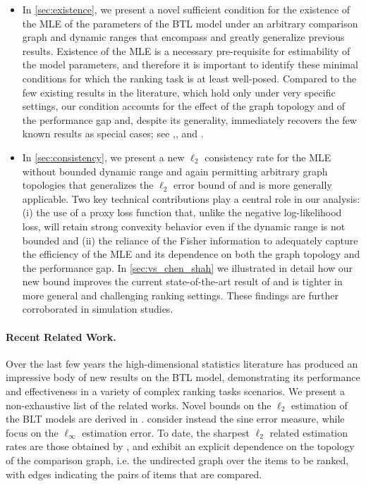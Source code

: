 \begin{itemize}
    \item In \ref{sec:existence}, we present a novel sufficient condition for the existence of the MLE of the parameters of the BTL model under an arbitrary comparison graph and dynamic ranges that encompass and greatly generalize previous results. Existence of the MLE is a necessary pre-requisite for estimability of the model parameters, and therefore it is important to identify these minimal conditions for which the ranking task is at least well-posed. Compared to the few existing results in the literature, which hold only under very specific settings, our condition accounts for the effect of the graph topology and of the performance gap and, despite its generality, immediately recovers the few known results   as special cases; see \citet{simons1999asymptotics},\citet{yan2012sparse}, and \citet{han2020asymptotic}. 

    \item In \ref{sec:consistency}, we present a new $\ell_2$ consistency rate for the MLE without bounded dynamic range and again permitting arbitrary graph topologies that generalizes the $\ell_2$ error bound of \cite{shah2016estimation} and is more generally applicable. Two key technical contributions play a central role in our analysis:  (i) the use of a proxy loss function  that, unlike the negative log-likelihood loss, will retain strong convexity behavior even if the dynamic range is not bounded and (ii) the reliance of the Fisher information to adequately capture the efficiency of the MLE and its dependence on both the graph topology and the performance gap. In \ref{sec:vs_chen_shah} we illustrated in detail how our new bound improves  the current state-of-the-art result of \cite{shah2016estimation} and is tighter in more general and challenging ranking settings. These findings are further corroborated in simulation studies. 
\end{itemize}

\paragraph{Recent Related Work.} Over the last few years the high-dimensional statistics literature has produced an impressive body of new results on the  BTL model, demonstrating its performance and effectiveness in a variety of complex ranking tasks scenarios. We present a non-exhaustive list of the related works. Novel bounds on the $\ell_2$ estimation of the BLT models are derived in \citet{negahban2012iterative,hajek2014minimax,khetan2016computational,shah2016estimation,chen2020partial}. \citet{hendrickx2019graph,hendrickx2020minimax} consider instead the sine error measure, while \citet{chen2019spectralregmletopk,chen2020partial,chen2021full} focus on the $\ell_\infty$ estimation error. To date, the sharpest $\ell_2$ related estimation rates are those obtained by \citet{shah2016estimation,hendrickx2020minimax}, and exhibit an explicit dependence on the topology of the comparison graph, i.e. the undirected graph over the items to be ranked, with edges indicating the pairs of items that are compared.

